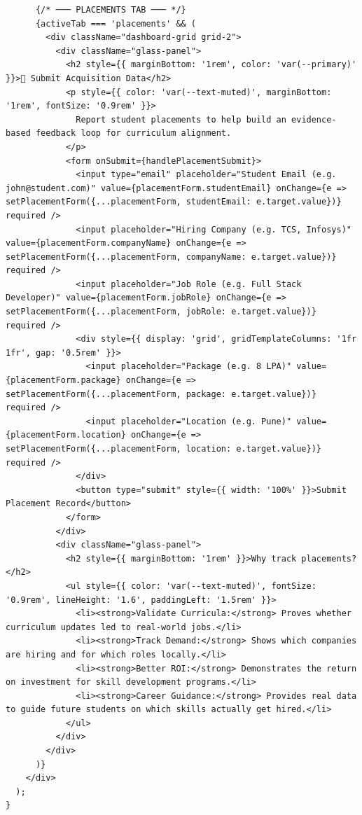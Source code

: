 \documentclass[12pt,a4paper]{report}
\begin{document}
\begin{verbatim}
      {/* ─── PLACEMENTS TAB ─── */}
      {activeTab === 'placements' && (
        <div className="dashboard-grid grid-2">
          <div className="glass-panel">
            <h2 style={{ marginBottom: '1rem', color: 'var(--primary)' }}>💎 Submit Acquisition Data</h2>
            <p style={{ color: 'var(--text-muted)', marginBottom: '1rem', fontSize: '0.9rem' }}>
              Report student placements to help build an evidence-based feedback loop for curriculum alignment.
            </p>
            <form onSubmit={handlePlacementSubmit}>
              <input type="email" placeholder="Student Email (e.g. john@student.com)" value={placementForm.studentEmail} onChange={e => setPlacementForm({...placementForm, studentEmail: e.target.value})} required />
              <input placeholder="Hiring Company (e.g. TCS, Infosys)" value={placementForm.companyName} onChange={e => setPlacementForm({...placementForm, companyName: e.target.value})} required />
              <input placeholder="Job Role (e.g. Full Stack Developer)" value={placementForm.jobRole} onChange={e => setPlacementForm({...placementForm, jobRole: e.target.value})} required />
              <div style={{ display: 'grid', gridTemplateColumns: '1fr 1fr', gap: '0.5rem' }}>
                <input placeholder="Package (e.g. 8 LPA)" value={placementForm.package} onChange={e => setPlacementForm({...placementForm, package: e.target.value})} required />
                <input placeholder="Location (e.g. Pune)" value={placementForm.location} onChange={e => setPlacementForm({...placementForm, location: e.target.value})} required />
              </div>
              <button type="submit" style={{ width: '100%' }}>Submit Placement Record</button>
            </form>
          </div>
          <div className="glass-panel">
            <h2 style={{ marginBottom: '1rem' }}>Why track placements?</h2>
            <ul style={{ color: 'var(--text-muted)', fontSize: '0.9rem', lineHeight: '1.6', paddingLeft: '1.5rem' }}>
              <li><strong>Validate Curricula:</strong> Proves whether curriculum updates led to real-world jobs.</li>
              <li><strong>Track Demand:</strong> Shows which companies are hiring and for which roles locally.</li>
              <li><strong>Better ROI:</strong> Demonstrates the return on investment for skill development programs.</li>
              <li><strong>Career Guidance:</strong> Provides real data to guide future students on which skills actually get hired.</li>
            </ul>
          </div>
        </div>
      )}
    </div>
  );
}


\end{verbatim}
\end{document}
